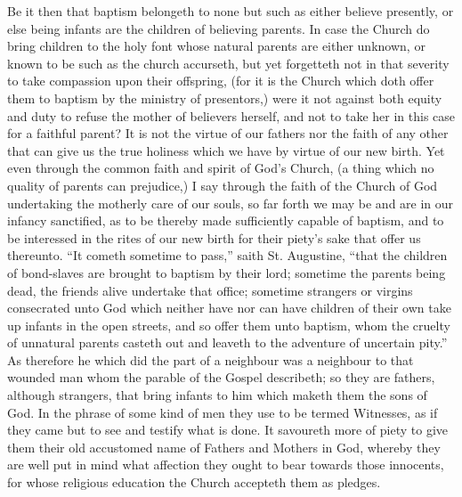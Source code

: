 Be it then that baptism belongeth to none but such as either believe presently, or else being infants are the children of believing parents. In case the Church do bring children to the holy font whose natural parents are either unknown, or known to be such as the church accurseth, but yet forgetteth not in that severity to take compassion upon their offspring, (for it is the Church which doth offer them to baptism by the ministry of presentors,) were it not against both equity and duty to refuse the mother of believers herself, and not to take her in this case for a faithful parent? It is not the virtue of our fathers nor the faith of any other that can give us the true holiness which we have by virtue of our new birth. Yet even through the common faith and spirit of God’s Church, (a thing which no quality of parents can prejudice,) I say through the faith of the Church of God undertaking the motherly care of our souls, so far forth we may be and are in our infancy sanctified, as to be thereby made sufficiently capable of baptism, and to be interessed in the rites of our new birth for their piety’s sake that offer us thereunto.
“It cometh sometime to pass,” saith St. Augustine, “that the children of bond-slaves are brought to baptism by their  lord; sometime the parents being dead, the friends alive undertake that office; sometime strangers or virgins consecrated unto God which neither have nor can have children of their own take up infants in the open streets, and so offer them unto baptism, whom the cruelty of unnatural parents casteth out and leaveth to the adventure of uncertain pity.” As therefore he which did the part of a neighbour was a neighbour to that wounded man whom the parable of the Gospel describeth; so they are fathers, although strangers, that bring infants to him which maketh them the sons of God. In the phrase of some kind of men they use to be termed Witnesses, as if they came but to see and testify what is done. It savoureth more of piety to give them their old accustomed name of Fathers and Mothers in God, whereby they are well put in mind what affection they ought to bear towards those innocents, for whose religious education the Church accepteth them as pledges.
